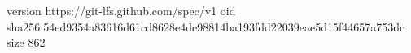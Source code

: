 version https://git-lfs.github.com/spec/v1
oid sha256:54ed9354a83616d61cd8628e4de98814ba193fdd22039eae5d15f44657a753dc
size 862

